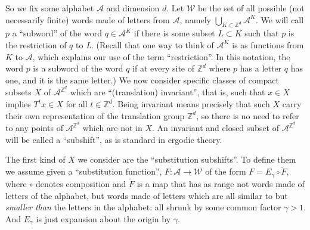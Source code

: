 \documentclass[reqno]{stml-l}
\theoremstyle{plain}
\theoremstyle{definition}
\numberwithin{equation}{chapter}
\begin{document}
So we fix some alphabet $\mathcal{A}$ and dimension $d$. Let $\mathcal{W}$ be the set of all possible (not necessarily finite) words made of letters from $\mathcal{A}$, namely $\bigcup_{K\subset \mathbb{Z}^{d}}\mathcal{A}^{K}$. We will call $p$ a ``subword'' of the word $q\in \mathcal{A}^{K}$ if there is some subset $L\subset K$ such that $p$ is the restriction of $q$ to \emph{L}. (Recall that one way to think of $\mathcal{A}^{K}$ is as functions from $K$ to $\mathcal{A}$, which explains our use of the term ``restriction''. In this notation, the word $p$ is a subword of the word $q$ if at every site of $\mathbb{Z}^{d}$ where $p$ has a letter $q$ has one, and it is the same letter.) We now consider specific classes of compact subsets $X$ of $\mathcal{A}^{\mathbb{Z}^{d}}$ which are
``(translation) invariant'', that is, such that $x\in X$ implies $T^{t}x\in X$ for all $t\in \mathbb{Z}^{d}$. Being invariant means precisely that such $X$ carry their own representation of the translation group $\mathbb{Z}^{d}$, so there is no need to refer to any points of $\mathcal{A}^{\mathbb{Z}^{d}}$ which are not in $X$. An invariant and closed subset of $\mathcal{A}^{\mathbb{Z}^{d}}$ will be called a ``subshift'', as is standard in ergodic theory.

The first kind of $X$ we consider are the ``substitution subshifts''. To define them we assume given a ``substitution function'', $F:\mathcal{A}\longrightarrow \mathcal{W}$ of the form $F=E_{\gamma}\circ\tilde{F}$, where $\circ$ denotes composition and $\tilde{F}$ is a map that has as range not words made of letters of the alphabet, but words made of letters which are all similar to but \emph{smaller than} the letters in the alphabet: all shrunk by some common factor $\gamma>1$. And $E_{\gamma}$ is just expansion about the origin by $\gamma$.
\end{document}
